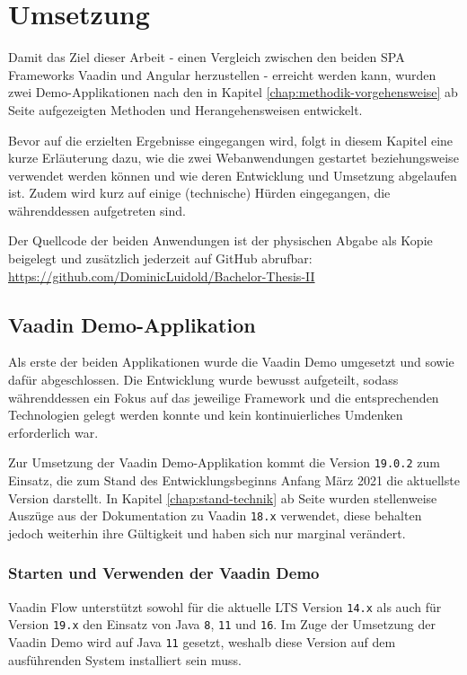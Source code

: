 \documentclass[a4paper,12pt,twoside]{scrreprt}
\begin{document}
\chapter{Umsetzung}
\label{chap:umsetzung}
Damit das Ziel dieser Arbeit - einen Vergleich zwischen den beiden \ac{SPA} Frameworks Vaadin und Angular herzustellen - erreicht werden kann, wurden zwei Demo-Applikationen nach den in Kapitel \ref{chap:methodik-vorgehensweise} ab Seite \pageref{chap:methodik-vorgehensweise} aufgezeigten Methoden und Herangehensweisen entwickelt.

Bevor auf die erzielten Ergebnisse eingegangen wird, folgt in diesem Kapitel eine kurze Erläuterung dazu, wie die zwei Webanwendungen gestartet beziehungsweise verwendet werden können und wie deren Entwicklung und Umsetzung abgelaufen ist. Zudem wird kurz auf einige (technische) Hürden eingegangen, die währenddessen aufgetreten sind.

Der Quellcode der beiden Anwendungen ist der physischen Abgabe als Kopie beigelegt und zusätzlich jederzeit auf GitHub abrufbar: \url{https://github.com/DominicLuidold/Bachelor-Thesis-II}

\section{Vaadin Demo-Applikation}
\label{sec:vaadin-demo}
Als erste der beiden Applikationen wurde die Vaadin Demo umgesetzt und \textit{} sowie \textit{} dafür abgeschlossen. Die Entwicklung wurde bewusst aufgeteilt, sodass währenddessen ein Fokus auf das jeweilige Framework und die entsprechenden Technologien gelegt werden konnte und kein kontinuierliches Umdenken erforderlich war.

\medskip

Zur Umsetzung der Vaadin Demo-Applikation kommt die Version \texttt{19.0.2} zum Einsatz, die zum Stand des Entwicklungsbeginns Anfang März 2021 die aktuellste Version darstellt. In  Kapitel \ref{chap:stand-technik} ab Seite \pageref{chap:stand-technik} wurden stellenweise Auszüge aus der Dokumentation zu Vaadin \texttt{18.x} verwendet, diese behalten jedoch weiterhin ihre Gültigkeit und haben sich nur marginal verändert.

\subsection{Starten und Verwenden der Vaadin Demo}
\label{sub-sec:starten-verwenden-vaadin}
Vaadin Flow unterstützt sowohl für die aktuelle \ac{LTS} Version \texttt{14.x} als auch für Version \texttt{19.x} den Einsatz von Java \texttt{8}, \texttt{11} und \texttt{16}. Im Zuge der Umsetzung der Vaadin Demo wird auf Java \texttt{11} gesetzt, weshalb diese Version auf dem ausführenden System installiert sein muss.
\end{document}
